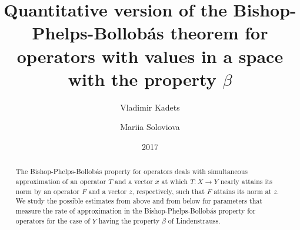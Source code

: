 \documentclass[11pt,a4paper]{amsart}
\numberwithin{equation}{section}
\theoremstyle{plain}
\theoremstyle{definition}
\begin{document}
\title[Quantitative version of the Bishop-Phelps-Bollob\'{a}s theorem for operators]{Quantitative version of the Bishop-Phelps-Bollob\'{a}s theorem for operators with values in a space with the property $\beta$}
\author[Kadets]{Vladimir Kadets}
\author[Soloviova]{Mariia Soloviova}

\address[Kadets]{Department of Mathematics and Informatics, Kharkiv V.~N.~Karazin National University, pl.~Svobody~4,
61022~Kharkiv, Ukraine
\newline
\href{http://orcid.org/0000-0002-5606-2679}{ORCID: \texttt{0000-0002-5606-2679} } }

\address[Soloviova]{Department of Mathematics and Informatics, Kharkiv V.~N.~Karazin National University, pl.~Svobody~4,
61022~Kharkiv, Ukraine
\newline
\href{http://orcid.org/0000-0002-3777-5286}{ORCID: \texttt{0000-0002-3777-5286} } }







\date{2017}
\begin{abstract}

The  Bishop-Phelps-Bollob\'{a}s property for operators deals with simultaneous approximation of an operator $T$ and a vector $x$ at which $T: X\rightarrow Y$ nearly attains its norm by an operator $F$ and a vector $z$, respectively, such that $F$ attains its norm at $z$. We study the possible estimates from above and from below for parameters that measure the rate of approximation in the Bishop-Phelps-Bollob\'{a}s property for operators for the case of $Y$ having the property $\beta$ of Lindenstrauss.
\end{abstract}
\maketitle
\end{document}
